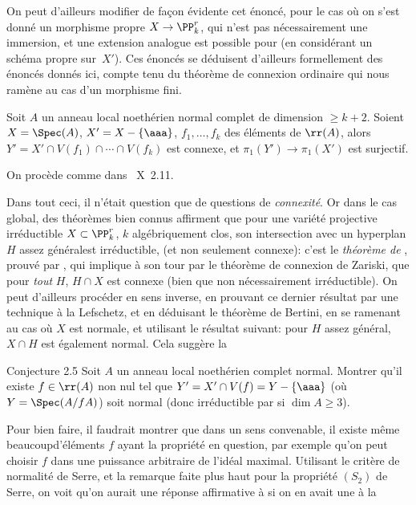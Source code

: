 On peut d'ailleurs modifier de fa\c con
\'evidente cet \'enonc\'e, pour le cas o\`u on s'est donn\'e un morphisme
propre $X \to \PP^r_k$, qui n'est pas n\'ecessairement une
immersion, et une extension analogue est possible pour
 (en consid\'erant un sch\'ema propre sur~$X'$). Ces
\'enonc\'es se d\'eduisent d'ailleurs formellement des \'enonc\'es donn\'es
ici, compte tenu du th\'eor\`eme de connexion ordinaire qui nous
ram\`ene au cas d'un morphisme fini.

\begin{corollaire} \label{XIII.2.4}
Soit $A$ un anneau local noeth\'erien normal complet de dimension $\ge k+2$. Soient $X=\Spec (A)$, $X'=X-\{ \aaa\}$, $f_1, \dotsc, f_k$ des \'el\'ements de $\rr(A)$, alors $Y'=X'\cap V(f_1) \cap \dotsb \cap V(f_k)$ est connexe, et $\pi_1(Y')\to \pi_1(X')$ est surjectif.
\end{corollaire}

On proc\`ede comme dans ~X~2.11.

Dans tout ceci, il n'\'etait question que de questions de \emph{connexit\'e}. Or dans le cas global, des th\'eor\`emes bien connus affirment que pour une vari\'et\'e projective irr\'eductible $X\subset \PP^r_k$, $k$ alg\'ebriquement clos, son intersection avec un hyperplan $H$ assez \og g\'en\'eral\fg est irr\'eductible, (et non seulement connexe): c'est le \emph{th\'eor\`eme de }, prouv\'e par , qui implique \`a son tour par le th\'eor\`eme de connexion de Zariski, que pour \emph{tout} $H$, $H\cap X$ est connexe (bien que non n\'ecessairement irr\'eductible). On peut d'ailleurs proc\'eder en sens inverse, en prouvant ce dernier r\'esultat par une technique \`a la Lefschetz, et en d\'eduisant le th\'eor\`eme de Bertini, en se ramenant au cas o\`u $X$ est normale, et utilisant le r\'esultat suivant: pour $H$ \og assez g\'en\'eral\fg, $X\cap H$ est \'egalement normal. Cela sugg\`ere la

\label{XIII.2.5}
\begin{enonce*}{Conjecture 2.5\ndemark}
Soit $A$ un anneau local noeth\'erien complet normal. Montrer qu'il existe $f\in\rr(A)$ non nul tel que $Y'=X'\cap V(f)=Y-\{ \aaa\}$ (o\`u\pageoriginale $Y=\Spec (A/fA)$) soit normal (donc irr\'eductible par  si $\dim A\ge 3$).
\end{enonce*}

Pour bien faire, il faudrait montrer que dans un sens convenable, il existe m\^eme \og beaucoup\fg d'\'el\'ements $f$ ayant la propri\'et\'e en question, par exemple qu'on peut choisir $f$ dans une puissance arbitraire de l'id\'eal maximal. Utilisant le crit\`ere de normalit\'e de Serre, et la remarque faite plus haut pour la propri\'et\'e $(S_2)$ de Serre, on voit qu'on aurait une r\'eponse affirmative \`a  si on en avait une \`a la

